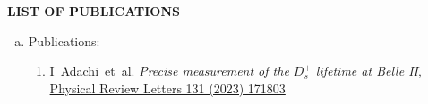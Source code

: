 \documentclass[12pt]{article}
\begin{document}
\pagebreak
\vspace{0.4cm}
\colorbox{gray!40}{\begin{minipage}{16.2cm}
    \bf {LIST OF PUBLICATIONS} 
\end{minipage} }
\begin{justify}
\begin{enumerate}[a.]
\item Publications:
  \begin{enumerate}[1.]
  \item I~Adachi~et~al. \emph{Precise measurement of the $D_s^+$ lifetime at Belle II}, \href{https://doi.org/10.1103/PhysRevLett.131.171803}{Physical Review Letters 131 (2023) 171803}

\end{enumerate}
\end{enumerate}
\end{justify}
\end{document}
